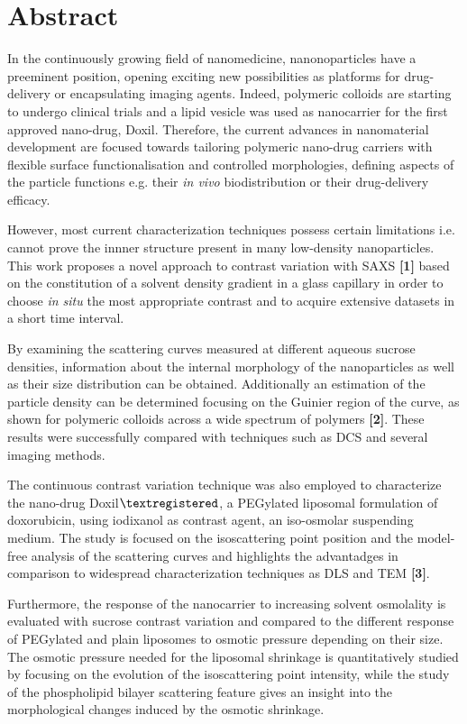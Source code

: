 \chapter*{Abstract}
\thispagestyle{empty}


In the continuously growing field of nanomedicine, nanonoparticles have a preeminent position, opening exciting new possibilities as platforms for drug-delivery or encapsulating imaging agents. Indeed, polymeric colloids are starting to undergo clinical trials and a lipid vesicle was used as nanocarrier for the first approved nano-drug, Doxil. Therefore, the current advances in nanomaterial development are focused towards tailoring polymeric nano-drug carriers with flexible surface functionalisation and controlled morphologies, defining aspects of the particle functions e.g. their \emph{in vivo} biodistribution or their drug-delivery efficacy. 

However, most current characterization techniques possess certain limitations i.e. cannot prove the innner structure present in many low-density nanoparticles. This work proposes a novel approach to contrast variation with SAXS \textbf{[1]} based on the constitution of a solvent density gradient in a glass capillary in order to choose \emph{in situ} the most appropriate contrast and to acquire extensive datasets in a short time interval.

By examining the scattering curves measured at different aqueous sucrose densities, information about the internal morphology of the nanoparticles as well as their size distribution can be obtained. Additionally an estimation of the particle density can be determined focusing on the Guinier region of the curve, as shown for polymeric colloids across a wide spectrum of polymers \textbf{[2]}. These results were successfully compared with techniques such as DCS and several imaging methods.

The continuous contrast variation technique was also employed to characterize the nano-drug Doxil$\textregistered$, a PEGylated liposomal formulation of doxorubicin, using iodixanol as contrast agent, an iso-osmolar suspending medium. The study is focused on the isoscattering point position and the model-free analysis of the scattering curves and highlights the advantadges in comparison to widespread characterization techniques as DLS and TEM \textbf{[3]}.

Furthermore, the response of the nanocarrier to increasing solvent osmolality is evaluated with sucrose contrast variation and compared to the different response of PEGylated and plain liposomes to osmotic pressure depending on their size. The osmotic pressure needed for the liposomal shrinkage is quantitatively studied by focusing on the evolution of the isoscattering point intensity, while the study of the phospholipid bilayer scattering feature gives an insight into the morphological changes induced by the osmotic shrinkage.

